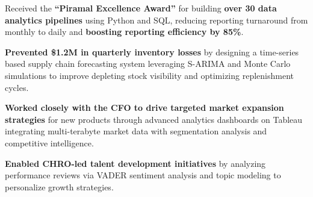 \documentclass[letterpaper,11pt]{article}
\newcommand{\resumeItem}[1]{
\justifying
  \item{\small{#1}}
  \vspace{-2px}
}
\begin{document}
\resumeItem{Received the \textbf{“Piramal Excellence Award”} for building \textbf{over 30 data analytics pipelines} using Python and SQL, reducing reporting turnaround from monthly to daily and \textbf{boosting reporting efficiency by 85\%}.}

\resumeItem{\textbf{Prevented \$1.2M in quarterly inventory losses} by designing a time-series based supply chain forecasting system leveraging S-ARIMA and Monte Carlo simulations to improve depleting stock visibility and optimizing replenishment cycles.}




\resumeItem{\textbf{Worked closely with the CFO to drive targeted market expansion strategies} for new products through advanced analytics dashboards on Tableau integrating multi-terabyte market data with segmentation analysis and competitive intelligence.}







\resumeItem{\textbf{Enabled CHRO-led talent development initiatives} by analyzing performance reviews via VADER sentiment analysis and topic modeling to personalize growth strategies.}
\end{document}
